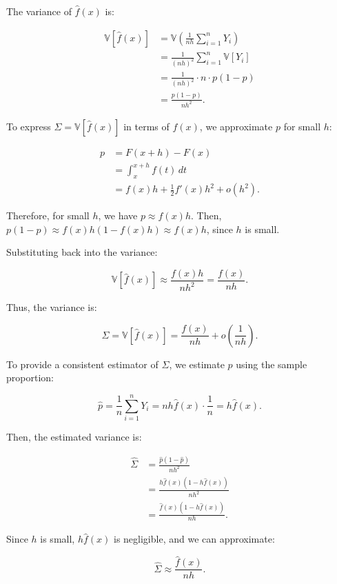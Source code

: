 \documentclass{article}
\begin{document}
The variance of \( \hat{f}(x) \) is:

\[
\begin{aligned}
\mathbb{V}[\hat{f}(x)] &= \mathbb{V}\left( \frac{1}{n h} \sum_{i=1}^n Y_i \right) \\
&= \frac{1}{(n h)^2} \sum_{i=1}^n \mathbb{V}[Y_i] \\
&= \frac{1}{(n h)^2} \cdot n \cdot p (1 - p) \\
&= \frac{p (1 - p)}{n h^2}.
\end{aligned}
\]

To express \( \Sigma = \mathbb{V}[\hat{f}(x)] \) in terms of \( f(x) \), we approximate \( p \) for small \( h \):

\[
\begin{aligned}
p &= F(x + h) - F(x) \\
&= \int_x^{x + h} f(t) \, dt \\
&= f(x) h + \frac{1}{2} f'(x) h^2 + o(h^2).
\end{aligned}
\]

Therefore, for small \( h \), we have \( p \approx f(x) h \). Then, \( p (1 - p) \approx f(x) h (1 - f(x) h) \approx f(x) h \), since \( h \) is small.

Substituting back into the variance:

\[
\mathbb{V}[\hat{f}(x)] \approx \frac{f(x) h}{n h^2} = \frac{f(x)}{n h}.
\]

Thus, the variance is:

\[
\Sigma = \mathbb{V}[\hat{f}(x)] = \frac{f(x)}{n h} + o\left( \frac{1}{n h} \right).
\]

To provide a consistent estimator of \( \Sigma \), we estimate \( p \) using the sample proportion:

\[
\hat{p} = \frac{1}{n} \sum_{i=1}^n Y_i = n h \hat{f}(x) \cdot \frac{1}{n} = h \hat{f}(x).
\]

Then, the estimated variance is:

\[
\begin{aligned}
\hat{\Sigma} &= \frac{\hat{p} (1 - \hat{p})}{n h^2} \\
&= \frac{h \hat{f}(x) \left( 1 - h \hat{f}(x) \right)}{n h^2} \\
&= \frac{\hat{f}(x) \left( 1 - h \hat{f}(x) \right)}{n h}.
\end{aligned}
\]

Since \( h \) is small, \( h \hat{f}(x) \) is negligible, and we can approximate:

\[
\hat{\Sigma} \approx \frac{\hat{f}(x)}{n h}.
\]
\end{document}
